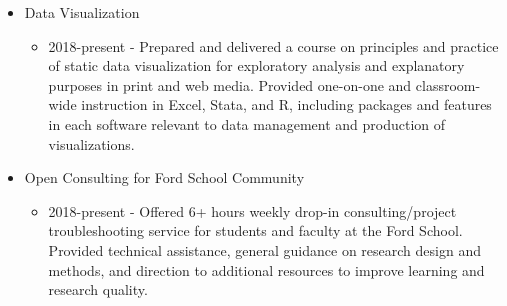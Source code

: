 \documentclass[10pt,letterpaper,unicode]{moderncv}        %
\begin{document}
{\begin{itemize}
\begin{itemize}
		\end{itemize}
	\item Data Visualization
		\begin{itemize}
			\item 2018-present - Prepared and delivered a course on principles and practice of static data visualization for exploratory analysis and explanatory purposes in print and web media. Provided one-on-one and classroom-wide instruction in Excel, Stata, and R, including packages and features in each software relevant to data management and production of visualizations.
		\end{itemize}
	\item Open Consulting for Ford School Community
		\begin{itemize}
			\item 2018-present - Offered 6+ hours weekly drop-in consulting/project troubleshooting service for students and faculty at the Ford School. Provided technical assistance, general guidance on research design and methods, and direction to additional resources to improve learning and research quality.
		\end{itemize}
\end{itemize}}
\end{document}

